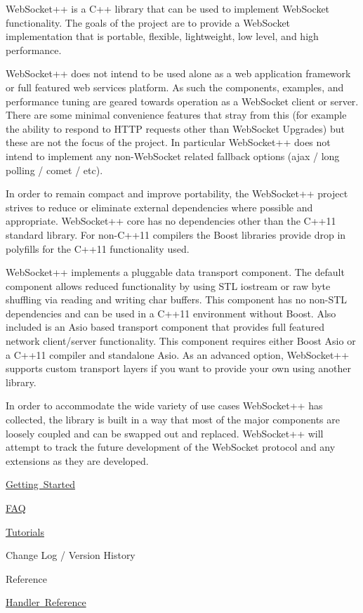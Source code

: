Web\+Socket++ is a C++ library that can be used to implement Web\+Socket functionality. The goals of the project are to provide a Web\+Socket implementation that is portable, flexible, lightweight, low level, and high performance.

Web\+Socket++ does not intend to be used alone as a web application framework or full featured web services platform. As such the components, examples, and performance tuning are geared towards operation as a Web\+Socket client or server. There are some minimal convenience features that stray from this (for example the ability to respond to H\+T\+TP requests other than Web\+Socket Upgrades) but these are not the focus of the project. In particular Web\+Socket++ does not intend to implement any non-\/\+Web\+Socket related fallback options (ajax / long polling / comet / etc).

In order to remain compact and improve portability, the Web\+Socket++ project strives to reduce or eliminate external dependencies where possible and appropriate. Web\+Socket++ core has no dependencies other than the C++11 standard library. For non-\/\+C++11 compilers the Boost libraries provide drop in polyfills for the C++11 functionality used.

Web\+Socket++ implements a pluggable data transport component. The default component allows reduced functionality by using S\+TL iostream or raw byte shuffling via reading and writing char buffers. This component has no non-\/\+S\+TL dependencies and can be used in a C++11 environment without Boost. Also included is an Asio based transport component that provides full featured network client/server functionality. This component requires either Boost Asio or a C++11 compiler and standalone Asio. As an advanced option, Web\+Socket++ supports custom transport layers if you want to provide your own using another library.

In order to accommodate the wide variety of use cases Web\+Socket++ has collected, the library is built in a way that most of the major components are loosely coupled and can be swapped out and replaced. Web\+Socket++ will attempt to track the future development of the Web\+Socket protocol and any extensions as they are developed.


\begin{DoxyItemize}
\item \mbox{\hyperlink{getting_started}{Getting Started}}
\item \mbox{\hyperlink{faq}{F\+AQ}}
\item \mbox{\hyperlink{tutorials}{Tutorials}}
\item Change Log / Version History
\item Reference
\begin{DoxyItemize}
\item \mbox{\hyperlink{reference_8handlers}{Handler Reference}} 
\end{DoxyItemize}
\end{DoxyItemize}